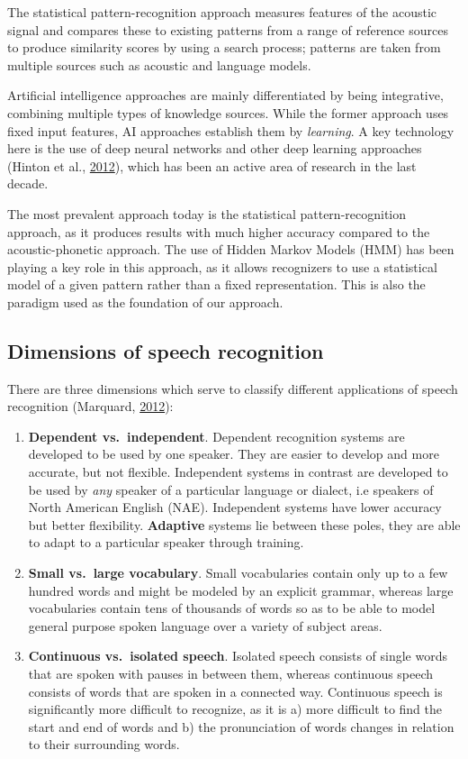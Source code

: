 \documentclass[]{article}
\begin{document}
The statistical pattern-recognition approach measures features of the
acoustic signal and compares these to existing patterns from a range of
reference sources to produce similarity scores by using a search
process; patterns are taken from multiple sources such as acoustic and
language models.

Artificial intelligence approaches are mainly differentiated by being
integrative, combining multiple types of knowledge sources. While the
former approach uses fixed input features, AI approaches establish them
by \emph{learning}. A key technology here is the use of deep neural
networks and other deep learning approaches (Hinton et al.,
\hyperref[ref-hinton2012deep]{2012}), which has been an active area of
research in the last decade.

The most prevalent approach today is the statistical pattern-recognition
approach, as it produces results with much higher accuracy compared to
the acoustic-phonetic approach. The use of Hidden Markov Models (HMM)
has been playing a key role in this approach, as it allows recognizers
to use a statistical model of a given pattern rather than a fixed
representation. This is also the paradigm used as the foundation of our
approach.

\subsection{Dimensions of speech
recognition}\label{dimensions-of-speech-recognition}

There are three dimensions which serve to classify different
applications of speech recognition (Marquard,
\hyperref[ref-marquard]{2012}):

\begin{enumerate}
\def\labelenumi{(\arabic{enumi})}
\item
  \textbf{Dependent vs.~independent}. Dependent recognition systems are
  developed to be used by one speaker. They are easier to develop and
  more accurate, but not flexible. Independent systems in contrast are
  developed to be used by \emph{any} speaker of a particular language or
  dialect, i.e speakers of North American English (NAE). Independent
  systems have lower accuracy but better flexibility. \textbf{Adaptive}
  systems lie between these poles, they are able to adapt to a
  particular speaker through training.
\item
  \textbf{Small vs.~large vocabulary}. Small vocabularies contain only
  up to a few hundred words and might be modeled by an explicit grammar,
  whereas large vocabularies contain tens of thousands of words so as to
  be able to model general purpose spoken language over a variety of
  subject areas.
\item
  \textbf{Continuous vs.~isolated speech}. Isolated speech consists of
  single words that are spoken with pauses in between them, whereas
  continuous speech consists of words that are spoken in a connected
  way. Continuous speech is significantly more difficult to recognize,
  as it is a) more difficult to find the start and end of words and b)
  the pronunciation of words changes in relation to their surrounding
  words.
\end{enumerate}
\end{document}
